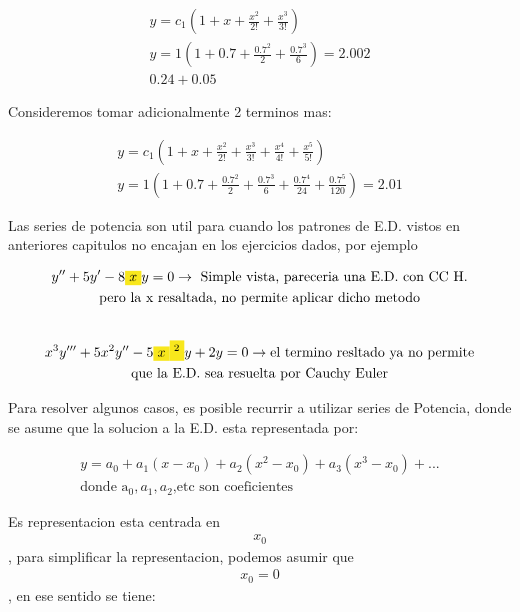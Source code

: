 \documentclass{article}
\begin{document}
\begin{gather*}
y =c_{1}(1+x + \frac{x^{2}}{2!}+\frac{x^{3}}{3!}) \\
y = 1(1+0.7+\frac{0.7^{2}}{2}+\frac{0.7^{3}}{6})=2.002 \\
             0.24 + 0.05
\end{gather*}


Consideremos tomar adicionalmente 2 terminos mas:


\begin{gather*}
y =c_{1}(1+x + \frac{x^{2}}{2!}+\frac{x^{3}}{3!}+\frac{x^{4}}{4!}+\frac{x^{5}}{5!}) \\
y = 1(1+0.7+\frac{0.7^{2}}{2}+\frac{0.7^{3}}{6}+\frac{0.7^{4}}{24}+\frac{0.7^{5}}{120})=2.01
\end{gather*}


Las series de potencia son util para cuando los patrones de E.D. vistos en anteriores capitulos no encajan en los ejercicios dados, por ejemplo


\begin{gather*}
y''+5y'-8\text{\colorbox[RGB]{248,231,28}{$x$}}y=0   \rightarrow \text{ Simple vista, pareceria una E.D. con CC H.} \\
\text{pero la x resaltada, no permite aplicar dicho metodo} \\
\vspace{0.5em} \\
x^{3}y'''+5x^{2}y''-5\text{\colorbox[RGB]{248,231,28}{$x$}}\text{\colorbox[RGB]{248,231,28}{$^{2}$}}y+2y=0  \rightarrow \text{el termino resltado ya no permite} \\
\text{que la E.D. sea resuelta por Cauchy Euler}
\end{gather*}


Para resolver algunos casos, es posible recurrir a utilizar series de Potencia, donde se asume que la solucion a la E.D. esta representada por:


\begin{gather*}
y = a_{0}+a_{1}(x-x_{0})+a_{2}(x^{2}-x_{0})+a_{3}(x^{3}-x_{0})+... \\
\text{donde a}_{0},a_{1},a_{2}\text{,etc son coeficientes}
\end{gather*}


Es representacion esta centrada en 
\begin{gather*}
x_{0}
\end{gather*}
, para simplificar la representacion, podemos asumir que 
\begin{gather*}
x_{0}=0
\end{gather*}
, en ese sentido se tiene:
\end{document}

